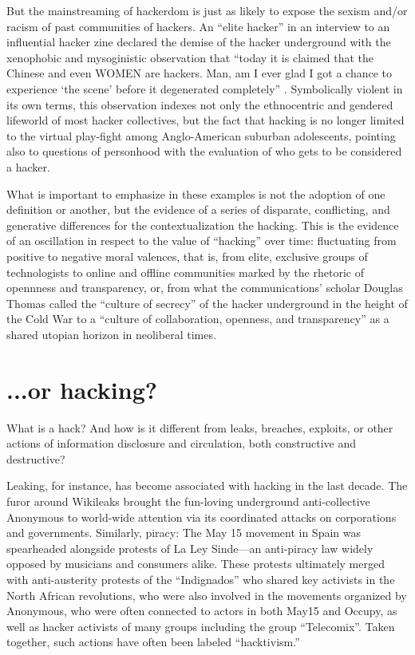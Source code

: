 \documentclass[10pt,letter,oneside]{scrartcl}
\begin{document}
But the mainstreaming of hackerdom is just as likely to expose the sexism
and/or racism of past communities of hackers.  An ``elite hacker'' in an
interview to an influential hacker zine declared the demise of the hacker
underground with the xenophobic and mysoginistic observation that ``today it
is claimed that the Chinese and even WOMEN are hackers. Man, am I ever glad I
got a chance to experience `the scene' before it degenerated completely''
\autocite{phrackmag_2016}.  Symbolically violent in its own terms, this
observation indexes not only the ethnocentric and gendered lifeworld of most
hacker collectives, but the fact that hacking is no longer limited to the
virtual play-fight among Anglo-American suburban adolescents, pointing also to
questions of personhood with the evaluation of who gets to be considered a
hacker.

What is important to emphasize in these examples is not the adoption of one
definition or another, but the evidence of a series of disparate, conflicting,
and generative differences for the contextualization the hacking. This is the
evidence of an oscillation in respect to the value of ``hacking'' over time:
fluctuating from positive to negative moral valences, that is, from elite,
exclusive groups of technologists to online and offline communities marked by
the rhetoric of opennness and transparency, or, from what the communications'
scholar Douglas Thomas called the ``culture of secrecy'' of the hacker
underground in the height of the Cold War to a ``culture of collaboration,
openness, and transparency'' as a shared utopian horizon in neoliberal times.

\section*{...or hacking?}

What is a hack?  And how is it different from leaks, breaches, exploits, or
other actions of information disclosure and circulation, both constructive and
destructive?

Leaking, for instance, has become associated with hacking in the last decade.
The furor around Wikileaks brought the fun-loving underground anti-collective
Anonymous to world-wide attention via its coordinated attacks on corporations
and governments.  Similarly, piracy: The May 15 movement in Spain was
spearheaded alongside protests of La Ley Sinde---an anti-piracy law widely
opposed by musicians and consumers alike.  These protests ultimately merged with
anti-austerity protests of the ``Indignados'' who shared key activists in the
North African revolutions, who were also involved in the movements organized by
Anonymous, who were often connected to actors in both May15 and Occupy, as well
as hacker activists of many groups including the group ``Telecomix''.  Taken
together, such actions have often been labeled ``hacktivism.''
\end{document}
